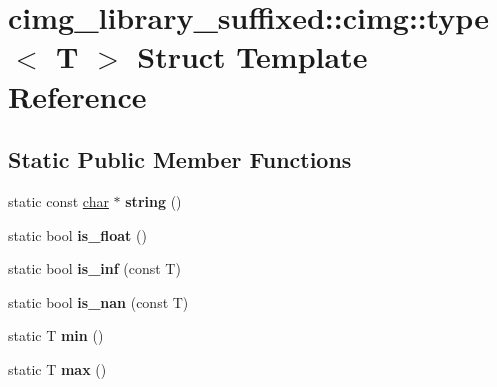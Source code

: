 \hypertarget{structcimg__library__suffixed_1_1cimg_1_1type}{}\section{cimg\+\_\+library\+\_\+suffixed\+:\+:cimg\+:\+:type$<$ T $>$ Struct Template Reference}
\label{structcimg__library__suffixed_1_1cimg_1_1type}
\subsection*{Static Public Member Functions}
\begin{DoxyCompactItemize}
\item 
\mbox{\label{structcimg__library__suffixed_1_1cimg_1_1type_a28283b420be4f56054ed57bd2204e1cd}} 
static const \hyperlink{classchar}{char} $\ast$ {\bfseries string} ()
\item 
\mbox{\label{structcimg__library__suffixed_1_1cimg_1_1type_a61e33681478cafa8ad578265de1640ff}} 
static bool {\bfseries is\+\_\+float} ()
\item 
\mbox{\label{structcimg__library__suffixed_1_1cimg_1_1type_a9901998d7d790ba3e47c9ca8d09c043b}} 
static bool {\bfseries is\+\_\+inf} (const T)
\item 
\mbox{\label{structcimg__library__suffixed_1_1cimg_1_1type_a2e5b828afd6f5e0e82358059642887a7}} 
static bool {\bfseries is\+\_\+nan} (const T)
\item 
\mbox{\label{structcimg__library__suffixed_1_1cimg_1_1type_aa487045af10501b8718e50735aa13317}} 
static T {\bfseries min} ()
\item 
\mbox{\label{structcimg__library__suffixed_1_1cimg_1_1type_a4b01a896aa0c86ce9f3162f36fa2ae72}} 
static T {\bfseries max} ()
\item 
\mbox{\label{structcimg__library__suffixed_1_1cimg_1_1type_ac818c4773392cc85c58676270d752f90}} 

\end{DoxyCompactItemize}
